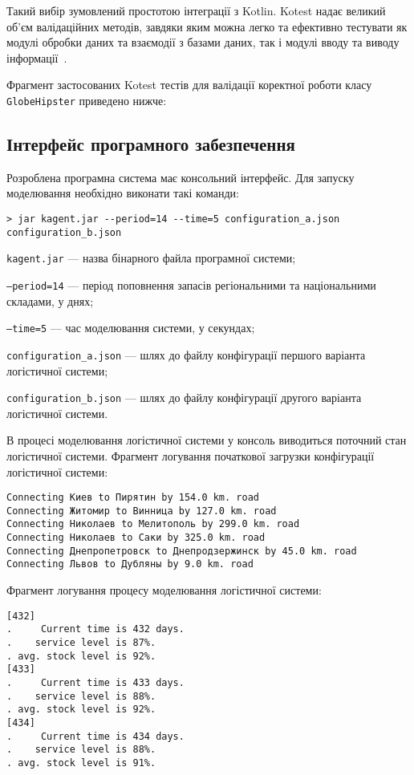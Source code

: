 Такий вибір зумовлений простотою інтеграції з Kotlin.
Kotest надає великий об'єм валідаційних методів, завдяки яким можна легко та ефективно тестувати як модулі обробки даних та взаємодії з базами даних, так і модулі вводу та виводу інформації~\cite{Kotest}.

Фрагмент застосованих Kotest тестів для валідації коректної роботи класу \texttt{GlobeHipster} приведено нижче:


\subsection{Інтерфейс програмного забезпечення}
Розроблена програмна система має консольний інтерфейс. Для запуску моделювання необхідно виконати такі команди:
\begin{lstlisting}
> jar kagent.jar --period=14 --time=5 configuration_a.json configuration_b.json
\end{lstlisting}
\begin{description}
	\item[де] \texttt{kagent.jar} --- назва бінарного файла програмної системи;
	\item \texttt{--period=14} --- період поповнення запасів регіональними та національними складами, у днях;
	\item \texttt{--time=5} --- час моделювання системи, у секундах;
	\item \texttt{configuration\_a.json} --- шлях до файлу конфігурації першого варіанта логістичної системи;
	\item \texttt{configuration\_b.json} --- шлях до файлу конфігурації другого варіанта логістичної системи.
\end{description}

В процесі моделювання логістичної системи у консоль виводиться поточний стан логістичної системи.
Фрагмент логування початкової загрузки конфігурації логістичної системи:
\begin{lstlisting}
Connecting Киев to Пирятин by 154.0 km. road
Connecting Житомир to Винница by 127.0 km. road
Connecting Николаев to Мелитополь by 299.0 km. road
Connecting Николаев to Саки by 325.0 km. road
Connecting Днепропетровск to Днепродзержинск by 45.0 km. road
Connecting Львов to Дубляны by 9.0 km. road
\end{lstlisting}

Фрагмент логування процесу моделювання логістичної системи:
\begin{lstlisting}
[432]
.     Current time is 432 days.
.    service level is 87%.
. avg. stock level is 92%.
[433]
.     Current time is 433 days.
.    service level is 88%.
. avg. stock level is 92%.
[434]
.     Current time is 434 days.
.    service level is 88%.
. avg. stock level is 91%.
\end{lstlisting}

